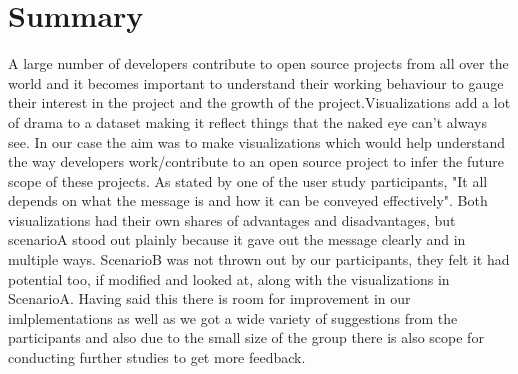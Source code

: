 \documentclass[seploa]{beavtex}
\begin{document}
\chapter{Summary}
A large number of developers contribute to open source projects from all over the world and it becomes important to understand their working behaviour to gauge their interest in the project and the growth of the project.Visualizations add a lot of drama to a dataset making it reflect things that the naked eye can't always see. In our case the aim was to make visualizations which would help understand the way developers work/contribute to an open source project to infer the future scope of these projects. As stated by one of the user study participants, "It all depends on what the message is and how it can be conveyed effectively". Both visualizations had their own shares of advantages and disadvantages, but scenarioA stood out plainly because it gave out the message clearly and in multiple ways. ScenarioB was not thrown out by our participants, they felt it had potential too, if modified and looked at, along with the visualizations in ScenarioA. Having said this there is room for improvement in our imlplementations as well as we got a wide variety of suggestions from the participants and also due to the small size of the group there is also scope for conducting further studies to get more feedback. 



\end{document}
